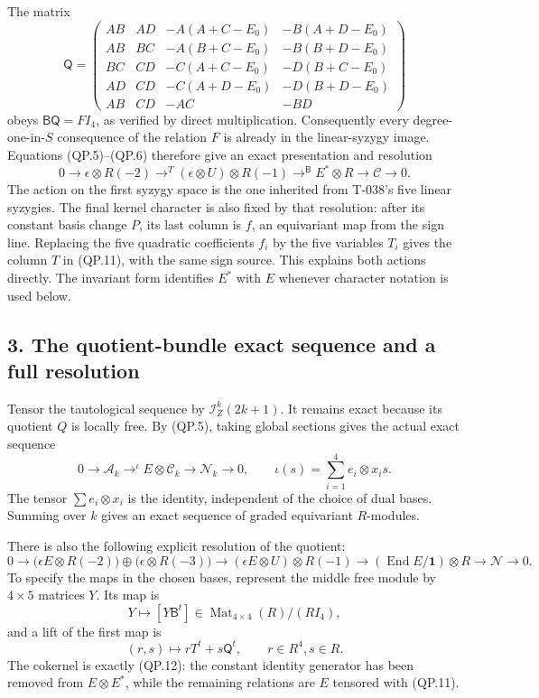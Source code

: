 \documentclass[
  10pt,
]{article}
\begin{document}
The matrix \[
\mathsf Q=\begin{pmatrix}
AB&AD&-A(A+C-E_0)&-B(A+D-E_0)\\
AB&BC&-A(B+C-E_0)&-B(B+D-E_0)\\
BC&CD&-C(A+C-E_0)&-D(B+C-E_0)\\
AD&CD&-C(A+D-E_0)&-D(B+D-E_0)\\
AB&CD&-AC&-BD
\end{pmatrix}
\tag{QP.10}
\] obeys \(\mathsf B\mathsf Q=F I_4\), as verified by direct
multiplication. Consequently every degree-one-in-\(S\) consequence of
the relation \(F\) is already in the linear-syzygy image. Equations
(QP.5)--(QP.6) therefore give an exact presentation and resolution \[
\boxed{
0\longrightarrow\epsilon\otimes R(-2)
\mathrel{\mathop{\longrightarrow}^{T}}
(\epsilon\otimes U)\otimes R(-1)
\mathrel{\mathop{\longrightarrow}^{\mathsf B}}
E^*\otimes R\longrightarrow\mathcal C\longrightarrow0.}
\tag{QP.11}
\] The action on the first syzygy space is the one inherited from
T-038's five linear syzygies. The final kernel character is also fixed
by that resolution: after its constant basis change \(P\), its last
column is \(f\), an equivariant map from the sign line. Replacing the
five quadratic coefficients \(f_i\) by the five variables \(T_i\) gives
the column \(T\) in (QP.11), with the same sign source. This explains
both actions directly. The invariant form identifies \(E^*\) with \(E\)
whenever character notation is used below.

\subsection{3. The quotient-bundle exact sequence and a full
resolution}\label{the-quotient-bundle-exact-sequence-and-a-full-resolution}

Tensor the tautological sequence by \(\mathcal I_Z^k(2k+1)\). It remains
exact because its quotient \(Q\) is locally free. By (QP.5), taking
global sections gives the actual exact sequence \[
0\longrightarrow\mathcal A_k
\mathrel{\mathop{\longrightarrow}^{\iota}}
E\otimes\mathcal C_k\longrightarrow\mathcal N_k\longrightarrow0,
\qquad
\iota(s)=\sum_{i=1}^4 e_i\otimes x_i s.
\tag{QP.12}
\] The tensor \(\sum e_i\otimes x_i\) is the identity, independent of
the choice of dual bases. Summing over \(k\) gives an exact sequence of
graded equivariant \(R\)-modules.

There is also the following explicit resolution of the quotient: \[
\boxed{
0\longrightarrow
\bigl(\epsilon E\otimes R(-2)\bigr)\oplus
\bigl(\epsilon\otimes R(-3)\bigr)
\longrightarrow
(\epsilon E\otimes U)\otimes R(-1)
\longrightarrow
(\operatorname{End}E/\mathbf1)\otimes R
\longrightarrow\mathcal N\longrightarrow0.}
\tag{QP.13}
\] To specify the maps in the chosen bases, represent the middle free
module by \(4\times5\) matrices \(Y\). Its map is \[
Y\longmapsto[Y\mathsf B^t]\in
\operatorname{Mat}_{4\times4}(R)/(R I_4),
\] and a lift of the first map is \[
(r,s)\longmapsto rT^t+s\mathsf Q^t,
\qquad r\in R^4, s\in R.
\tag{QP.14}
\] The cokernel is exactly (QP.12): the constant identity generator has
been removed from \(E\otimes E^*\), while the remaining relations are
\(E\) tensored with (QP.11).
\end{document}
